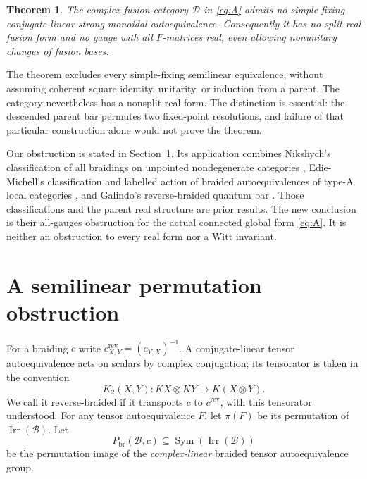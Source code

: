 \documentclass[11pt]{amsart}
\newtheorem{theorem}{Theorem}[section]
\theoremstyle{remark}
\newcommand{\B}{\mathcal B}
\newcommand{\D}{\mathcal D}
\newcommand{\Irr}{\operatorname{Irr}}
\newcommand{\rev}{\mathrm{rev}}
\newcommand{\Br}{\mathrm{br}}
\begin{document}
\begin{theorem}\label{thm:main}
The complex fusion category $\D$ in \eqref{eq:A} admits no simple-fixing
conjugate-linear strong monoidal autoequivalence.
Consequently it has no split real fusion form and no gauge with all
$F$-matrices real, even allowing nonunitary changes of fusion bases.
\end{theorem}

The theorem excludes every simple-fixing semilinear equivalence, without
assuming coherent square identity, unitarity, or induction from a parent.
The category nevertheless has a nonsplit real form. The distinction is
essential: the descended parent bar permutes two fixed-point resolutions,
and failure of that particular construction alone would not prove the
theorem.

Our obstruction is stated in Section~\ref{sec:criterion}. Its application
combines Nikshych's classification of all braidings on unpointed
nondegenerate categories \cite[Corollary~4.8]{Nikshych}, Edie-Michell's
classification and labelled action of braided autoequivalences of type-A
local categories \cite{Edie}, and Galindo's reverse-braided quantum bar
\cite[Lemma~3.23]{Galindo}. Those classifications and the parent real
structure are prior results. The new conclusion is their all-gauges
obstruction for the actual connected global form \eqref{eq:A}. It is
neither an obstruction to every real form nor a Witt invariant.

\section{A semilinear permutation obstruction}\label{sec:criterion}

For a braiding $c$ write
$c^{\rev}_{X,Y}=(c_{Y,X})^{-1}$.
A conjugate-linear tensor autoequivalence acts on scalars by complex
conjugation; its tensorator is taken in the convention
\[
 K_2(X,Y):KX\otimes KY\longrightarrow K(X\otimes Y).
\]
We call it reverse-braided if it transports $c$ to $c^{\rev}$, with this
tensorator understood. For any tensor autoequivalence $F$, let $\pi(F)$
be its permutation of $\Irr(\B)$. Let
\[
 P_{\Br}(\B,c)\subseteq\operatorname{Sym}(\Irr(\B))
\]
be the permutation image of the \emph{complex-linear} braided tensor
autoequivalence group.
\end{document}
